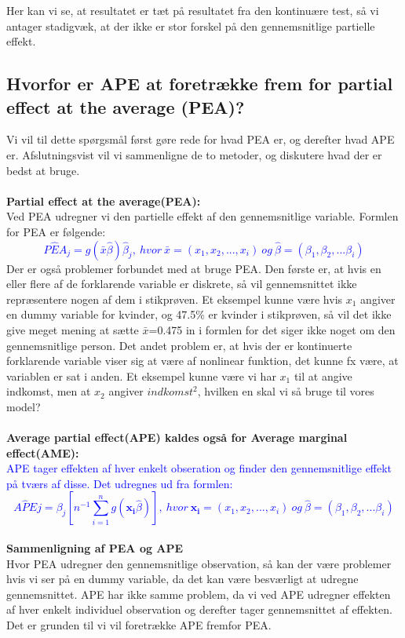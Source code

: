 \documentclass[
  10pt,
]{article}
\begin{document}
Her kan vi se, at resultatet er tæt på resultatet fra den kontinuære
test, så vi antager stadigvæk, at der ikke er stor forskel på den
gennemsnitlige partielle effekt. \newpage

\hypertarget{hvorfor-er-ape-at-foretruxe6kke-frem-for-partial-effect-at-the-average-pea}{%
\subsection{Hvorfor er APE at foretrække frem for partial effect at the
average
(PEA)?}\label{hvorfor-er-ape-at-foretruxe6kke-frem-for-partial-effect-at-the-average-pea}}

Vi vil til dette spørgsmål først gøre rede for hvad PEA er, og derefter
hvad APE er. Afslutningsvist vil vi sammenligne de to metoder, og
diskutere hvad der er bedst at bruge.\\
~\\
\textbf{Partial effect at the average(PEA):}\\
Ved PEA udregner vi den partielle effekt af den gennemsnitlige variable.
Formlen for PEA er følgende: \textcolor{blue}{
\[ P\hat{E}A_j=g(\bar{x}\hat{\beta})\hat{\beta}_j, \ hvor\ \bar{x}=(x_1,x_2,...,x_i)\ og\ \hat{\beta}=(\beta_1,\beta_2,...\beta_i)\]}
Der er også problemer forbundet med at bruge PEA. Den første er, at hvis
en eller flere af de forklarende variable er diskrete, så vil
gennemsnittet ikke repræsentere nogen af dem i stikprøven. Et eksempel
kunne være hvis \(x_1\) angiver en dummy variable for kvinder, og 47.5\%
er kvinder i stikprøven, så vil det ikke give meget mening at sætte
\(\bar{x}\)=0.475 in i formlen for det siger ikke noget om den
gennemsnitlige person. Det andet problem er, at hvis der er kontinuerte
forklarende variable viser sig at være af nonlinear funktion, det kunne
fx være, at variablen er sat i anden. Et eksempel kunne være vi har
\(x_1\) til at angive indkomst, men at \(x_2\) angiver \(indkomst^2\),
hvilken en skal vi så bruge til vores model?\\
~\\
\textbf{Average partial effect(APE) kaldes også for Average marginal effect(AME):}\\
\textcolor{blue}{
APE tager effekten af hver enkelt obseration og finder den gennemsnitlige effekt på tværs af disse. Det udregnes ud fra formlen:
\[A\hat{P}Ej=\hat{\beta_j}\left[n^{-1}\sum\limits_{i=1}^ng(\mathbf{x_i}\hat{\beta})\right],\ hvor\ \mathbf{x_i}=(x_1,x_2,...,x_i)\ og\ \hat{\beta}=(\beta_1,\beta_2,...\beta_i) \] }\\
\textbf{Sammenligning af PEA og APE}\\
Hvor PEA udregner den gennemsnitlige observation, så kan der være
problemer hvis vi ser på en dummy variable, da det kan være besværligt
at udregne gennemsnittet. APE har ikke samme problem, da vi ved APE
udregner effekten af hver enkelt individuel observation og derefter
tager gennemsnittet af effekten. Det er grunden til vi vil foretrække
APE fremfor PEA. \newpage
\end{document}
